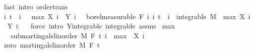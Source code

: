 \begin{isabellebody}
\ {\isacharparenleft}{\kern0pt}fast\ intro{\isacharcolon}{\kern0pt}\ order{\isachardot}{\kern0pt}trans{\isacharparenright}{\kern0pt}\isanewline
\ \ \isacommand{{\isacharbraceright}{\kern0pt}}\isamarkupfalse%
\isanewline
\ \ \isamarkupfalse%
\ {\isachardoublequoteopen}{\isasymAnd}i{\isachardot}{\kern0pt}\ t\ {\isasymle}\ i\ {\isasymLongrightarrow}\ {\isacharparenleft}{\kern0pt}{\isasymlambda}{\isasymxi}{\isachardot}{\kern0pt}\ max\ {\isacharparenleft}{\kern0pt}X\ i\ {\isasymxi}{\isacharparenright}{\kern0pt}\ {\isacharparenleft}{\kern0pt}Y\ i\ {\isasymxi}{\isacharparenright}{\kern0pt}{\isacharparenright}{\kern0pt}\ {\isasymin}\ borel{\isacharunderscore}{\kern0pt}measurable\ {\isacharparenleft}{\kern0pt}F\ i{\isacharparenright}{\kern0pt}{\isachardoublequoteclose}\ {\isachardoublequoteopen}{\isasymAnd}i{\isachardot}{\kern0pt}\ t\ {\isasymle}\ i\ {\isasymLongrightarrow}\ integrable\ M\ {\isacharparenleft}{\kern0pt}{\isasymlambda}{\isasymxi}{\isachardot}{\kern0pt}\ max\ {\isacharparenleft}{\kern0pt}X\ i\ {\isasymxi}{\isacharparenright}{\kern0pt}\ {\isacharparenleft}{\kern0pt}Y\ i\ {\isasymxi}{\isacharparenright}{\kern0pt}{\isacharparenright}{\kern0pt}{\isachardoublequoteclose}\ \isamarkupfalse%
\ {\isacharparenleft}{\kern0pt}force\ intro{\isacharcolon}{\kern0pt}\ Y{\isachardot}{\kern0pt}integrable\ integrable\ assms{\isacharparenright}{\kern0pt}{\isacharplus}{\kern0pt}\isanewline
{}\isamarkupfalse%
%
\endisatagproof
{\isafoldproof}%
%
\isadelimproof
\isanewline
%
\endisadelimproof
\isanewline
{}\isamarkupfalse%
\ max{\isacharunderscore}{\kern0pt}{}{\isacharcolon}{\kern0pt}\isanewline
\ \ \ {\isachardoublequoteopen}submartingale{\isacharunderscore}{\kern0pt}linorder\ M\ F\ t\ {\isacharparenleft}{\kern0pt}{\isasymlambda}i\ {\isasymxi}{\isachardot}{\kern0pt}\ max\ {}\ {\isacharparenleft}{\kern0pt}X\ i\ {\isasymxi}{\isacharparenright}{\kern0pt}{\isacharparenright}{\kern0pt}{\isachardoublequoteclose}\isanewline
%
\isadelimproof
%
\endisadelimproof
%
\isatagproof
{}\isamarkupfalse%
\ {\isacharminus}{\kern0pt}\isanewline
\ \ \isamarkupfalse%
\ zero{\isacharcolon}{\kern0pt}\ martingale{\isacharunderscore}{\kern0pt}linorder\ M\ F\ t\ {\isachardoublequoteopen}{\isasymlambda}{\isacharunderscore}{\kern0pt}\ {\isacharunderscore}{\kern0pt}{\isachardot}{\kern0pt}\ {}{\isachardoublequoteclose}\ \isamarkupfalse%

\end{isabellebody}
